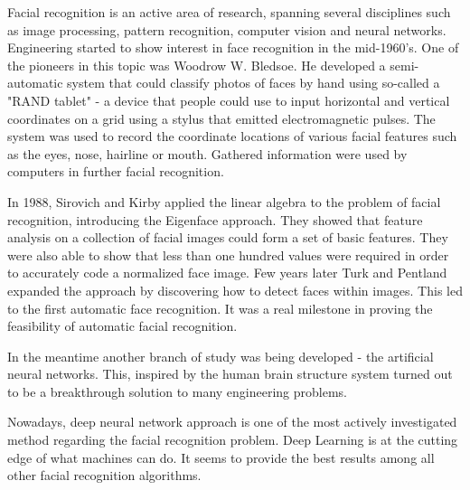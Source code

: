 Facial recognition is an active area of research, spanning several disciplines such as image processing, pattern recognition, computer vision and neural networks. Engineering started to show interest in face recognition in the mid-1960’s. One of the pioneers in this topic was Woodrow W. Bledsoe. He developed a semi-automatic system that could classify photos of faces by hand using so-called a "RAND tablet" - a device that people could use to input horizontal and vertical coordinates on a grid using a stylus that emitted electromagnetic pulses. The system was used to record the coordinate locations of various facial features such as the eyes, nose, hairline or mouth. Gathered information were used by computers in further facial recognition. 


In 1988, Sirovich and Kirby applied the linear algebra to the problem of facial recognition, introducing the Eigenface approach. They showed that feature analysis on a collection of facial images could form a set of basic features. They were also able to show that less than one hundred values were required in order to accurately code a normalized face image. Few years later Turk and Pentland expanded the approach by discovering how to detect faces within images. This led to the first automatic face recognition. It was a real milestone in proving the feasibility of automatic facial recognition.

In the meantime another branch of study was being developed - the artificial neural networks. This, inspired by the human brain structure system turned out to be a breakthrough solution to many engineering problems. 

Nowadays, deep neural network approach is one of the most actively investigated method regarding the facial recognition problem. Deep Learning is at the cutting edge of what machines can do. It seems to provide the best results among all other facial recognition algorithms. 




















